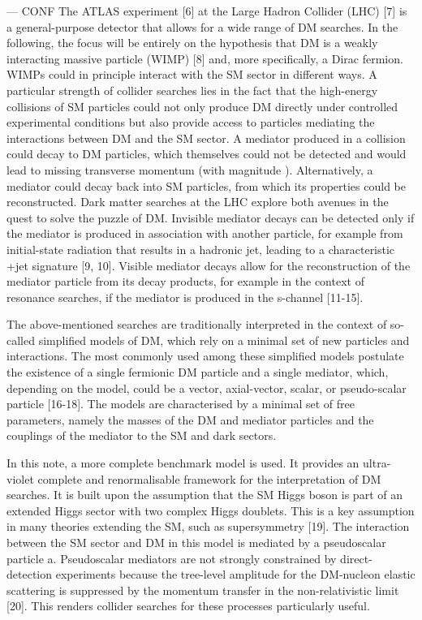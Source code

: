 ---
CONF %
The ATLAS experiment [6] at the Large Hadron Collider (LHC) [7] is a general-purpose detector that allows
for a wide range of DM searches. In the following, the focus will be entirely on the hypothesis that DM is a
weakly interacting massive particle (WIMP) [8] and, more specifically, a Dirac fermion. WIMPs could in
principle interact with the SM sector in different ways. A particular strength of collider searches lies in the
fact that the high-energy collisions of SM particles could not only produce DM directly under controlled
experimental conditions but also provide access to particles mediating the interactions between DM and
the SM sector. A mediator produced in a collision could decay to DM particles, which themselves could
not be detected and would lead to missing transverse momentum (with magnitude \MET). Alternatively, a
mediator could decay back into SM particles, from which its properties could be reconstructed.
Dark matter searches at the LHC explore both avenues in the quest to solve the puzzle of DM. Invisible
mediator decays can be detected only if the mediator is produced in association with another particle,
for example from initial-state radiation that results in a hadronic jet, leading to a characteristic \MET+jet
signature [9, 10]. Visible mediator decays allow for the reconstruction of the mediator particle from
its decay products, for example in the context of resonance searches, if the mediator is produced in the
s-channel [11-15].

The above-mentioned searches are traditionally interpreted in the context of so-called simplified models of
DM, which rely on a minimal set of new particles and interactions. The most commonly used among these
simplified models postulate the existence of a single fermionic DM particle and a single mediator, which,
depending on the model, could be a vector, axial-vector, scalar, or pseudo-scalar particle [16-18]. The
models are characterised by a minimal set of free parameters, namely the masses of the DM and mediator
particles and the couplings of the mediator to the SM and dark sectors.

In this note, a more complete benchmark model is used. It provides an ultra-violet complete and
renormalisable framework for the interpretation of DM searches. It is built upon the assumption that the
SM Higgs boson is part of an extended Higgs sector with two complex Higgs doublets. This is a key
assumption in many theories extending the SM, such as supersymmetry [19]. The interaction between the
SM sector and DM in this model is mediated by a pseudoscalar particle a. Pseudoscalar mediators are not
strongly constrained by direct-detection experiments because the tree-level amplitude for the DM-nucleon
elastic scattering is suppressed by the momentum transfer in the non-relativistic limit [20]. This renders
collider searches for these processes particularly useful.


